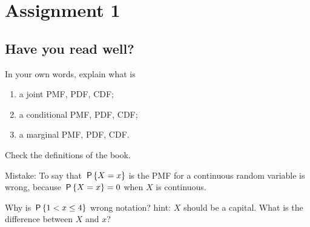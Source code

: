 \documentclass[assignments]{subfiles}
\begin{document}
\section{Assignment 1}
\label{sec:org9cbca82}


\subsection{Have you read well?}
\label{sec:have-you-read}


\begin{exercise}
In your own words, explain what is
\begin{enumerate}
\item a joint PMF, PDF, CDF;
\item a conditional PMF, PDF, CDF;
\item a marginal PMF, PDF, CDF.
\end{enumerate}
\begin{solution}
Check the definitions of the book.

Mistake: To say that $\P{X=x}$ is the PMF for a continuous random variable is wrong, because $\P{X=x}=0$ when $X$ is continuous.

Why is $\P{1 < x \leq 4}$ wrong notation?
hint: $X$ should be a capital.
What is the difference between $X$ and $x$?

\end{solution}
\end{exercise}
\end{document}
